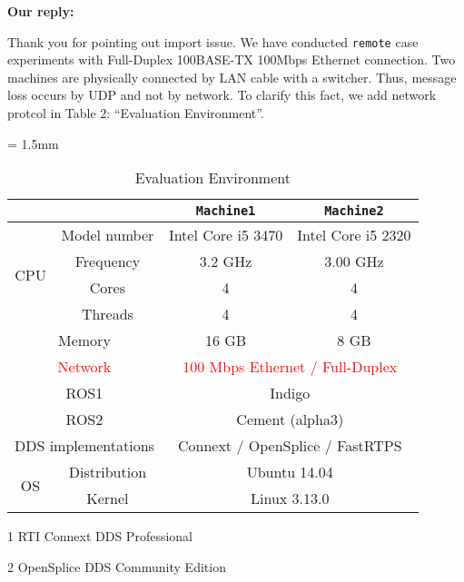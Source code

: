 \documentclass{article}
\begin{document}
\begin{enumerate}
  \begin{flushleft}
    \textbf{Our reply:}
  \end{flushleft}
  Thank you for pointing out import issue. 
  We have conducted \texttt{remote} case experiments with Full-Duplex 100BASE-TX 100Mbps Ethernet connection.
  Two machines are physically connected by LAN cable with a switcher.
  Thus, message loss occurs by UDP and not by network.
  To clarify this fact, we add network protcol in Table 2: ``Evaluation Environment''.
  \begin{table*}[htb]
    \caption{Evaluation Environment} 
    \centering
    \begin{threeparttable}
      \renewcommand{\arraystretch}{1.0}
      \label{tb:environment}
      \small
      \tabcolsep = 1.5mm              %
      \begin{tabular}{c|c||c|c}
        \hline
        \multicolumn{2}{c||}{ } & \textbf{\texttt{Machine1}} & \textbf{\texttt{Machine2}} \\ \hline \hline
        \multirow{4}{*}{CPU}   & Model number & Intel Core i5 3470 & Intel Core i5 2320 \\ 
        & Frequency & 3.2 GHz & 3.00 GHz \\ 
        & Cores & 4 & 4 \\ 
        & Threads & 4 & 4 \\ \hline
        \multicolumn{2}{c||}{Memory} & 16 GB & 8 GB \\ \hline 
        \multicolumn{2}{c||}{\textcolor{red}{Network}} & \multicolumn{2}{c}{\textcolor{red}{100 Mbps Ethernet / Full-Duplex}} \\ \hline
        \multicolumn{2}{c||}{ROS1} & \multicolumn{2}{c}{Indigo} \\ 
        \multicolumn{2}{c||}{ROS2} & \multicolumn{2}{c}{Cement (alpha3)} \\ 
        \multicolumn{2}{c||}{DDS implementations} & \multicolumn{2}{c}{Connext\tnote{1} / OpenSplice\tnote{2} / FastRTPS } \\ \hline 
        \multirow{2}{*}{OS} & Distribution & \multicolumn{2}{c}{Ubuntu 14.04} \\ 
        & Kernel & \multicolumn{2}{c}{Linux 3.13.0} \\ \hline
      \end{tabular}
      \begin{tablenotes}
      \item[1] RTI Connext DDS Professional \cite{rti_connext}
      \item[2] OpenSplice DDS Community Edition \cite{ospl_dds_community}
      \end{tablenotes}
    \end{threeparttable}
  \end{table*}
  

\end{enumerate}
\end{document}
